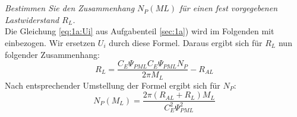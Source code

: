 \section{}\label{sec:1c}
\textit{Bestimmen Sie den Zusammenhang $ N_{P}(ML) $ für einen fest vorgegebenen Lastwiderstand $ R_{L} $.}\\
Die Gleichung \ref{eq:1a:Ui} aus Aufgabenteil \ref{sec:1a}) wird im Folgenden mit einbezogen. Wir ersetzen $ U_{i} $ durch diese Formel. Daraus ergibt sich für $ R_{L} $ nun folgender Zusammenhang:
\begin{equation}
	R_{L} = \frac{C_{E}\Psi_{PML}C_{E}\Psi_{PML}N_{P}}{2\pi M_{L}} - R_{AL}
	\label{eq:1c:RL}
\end{equation}
Nach entsprechender Umstellung der Formel ergibt sich für $ N_{P} $:
\begin{equation}
	N_{P}(M_{L}) = \frac{2\pi (R_{AL}+R_{L})M_{L}}{C_{E}^{2}\Psi_{PML}^{2}}
	\label{eq:1c:NP}
\end{equation}


\clearpage



